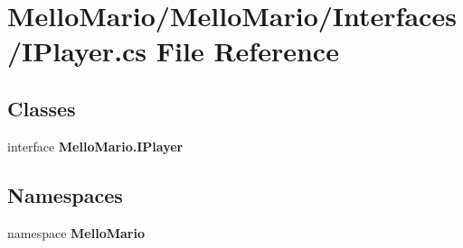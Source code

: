 \section{Mello\+Mario/\+Mello\+Mario/\+Interfaces/\+I\+Player.cs File Reference}
\label{IPlayer_8cs}
\subsection*{Classes}
\begin{DoxyCompactItemize}
\item 
interface \textbf{ Mello\+Mario.\+I\+Player}
\end{DoxyCompactItemize}
\subsection*{Namespaces}
\begin{DoxyCompactItemize}
\item 
namespace \textbf{ Mello\+Mario}
\end{DoxyCompactItemize}
